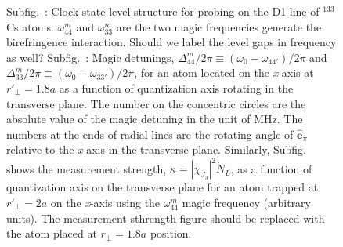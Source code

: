 \documentclass[preprint,aps,pra,onecolumn]{revtex4-1} %
\newcommand{\comment}[1]{{\color{Maroon} #1}}
\begin{document}
\begin{figure}
\begin{minipage}{.32\linewidth}
\centering
{}
\end{minipage}
\caption{Subfig.~\protect{}: Clock state level structure for probing on the D1-line of $^{133}$Cs atoms. 
$ \omega_{44}^m $ and $ \omega_{33}^m $ are the two magic frequencies generate the birefringence interaction.  
\comment{Should we label the level gaps in frequency as well?}
Subfig.~\protect{}: Magic detunings, $\Delta_{44}^m/2\pi \equiv (\omega_{0}-\omega_{44'})/2\pi$ and $\Delta_{33}^m/2\pi \equiv (\omega_{0}-\omega_{33'})/2\pi$, for an atom located on the \emph{x}-axis at $ r'\!_\perp=1.8a $ as a function of quantization axis rotating in the transverse plane. The number on the concentric circles are the absolute value of the magic detuning in the unit of MHz. The numbers at the ends of radial lines are the rotating angle of $ \hat{\mathbf{e}}_\pi $ relative to the \emph{x}-axis in the transverse plane. Similarly, Subfig.~\protect{} shows the measurement strength, $ \kappa=|\chi_{J_3}|^2 \dot{N}_L $, as a function of quantization axis on the transverse plane for an atom trapped at $ r'\!_\perp =2a $ on the \emph{x}-axis using the $ \omega_{44}^m $ magic frequency (arbitrary units). \comment{The measurement sthrength figure should be replaced with the atom placed at $ r\!_\perp=1.8a $ position.} }\label{Fig::CouplingStrength}
\end{figure}
\end{document}

